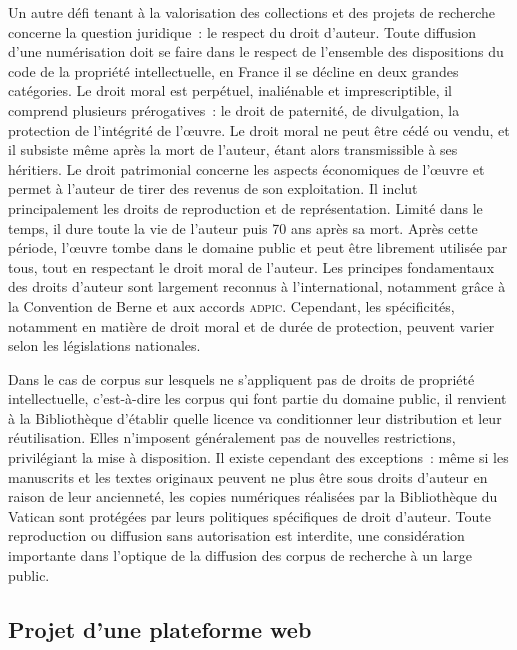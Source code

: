Un autre défi tenant à la valorisation des collections et des projets de
recherche concerne la question juridique~: le respect du droit d'auteur.
Toute diffusion d'une numérisation doit se faire dans le respect de
l'ensemble des dispositions du code de la propriété intellectuelle, en
France il se décline en deux grandes catégories. Le droit moral est
perpétuel, inaliénable et imprescriptible, il comprend plusieurs
prérogatives~: le droit de paternité, de divulgation, la protection de
l'intégrité de l'œuvre. Le droit moral ne peut être cédé ou vendu, et il
subsiste même après la mort de l'auteur, étant alors transmissible à ses
héritiers. Le droit patrimonial concerne les aspects économiques de
l'œuvre et permet à l'auteur de tirer des revenus de son exploitation.
Il inclut principalement les droits de reproduction et de
représentation. Limité dans le temps, il dure toute la vie de l'auteur
puis 70 ans après sa mort. Après cette période, l'œuvre tombe dans le
domaine public et peut être librement utilisée par tous, tout en
respectant le droit moral de l'auteur. Les principes fondamentaux des
droits d'auteur sont largement reconnus à l'international, notamment
grâce à la Convention de Berne et aux accords \textsc{adpic}. Cependant, les
spécificités, notamment en matière de droit moral et de durée de
protection, peuvent varier selon les législations nationales.

Dans le cas de corpus sur lesquels ne s'appliquent pas de droits de
propriété intellectuelle, c'est-à-dire les corpus qui font partie du
domaine public, il renvient à la Bibliothèque d'établir quelle licence
va conditionner leur distribution et leur réutilisation. Elles
n'imposent généralement pas de nouvelles restrictions, privilégiant la
mise à disposition. Il existe cependant des exceptions~: même si les
manuscrits et les textes originaux peuvent ne plus être sous droits
d'auteur en raison de leur ancienneté, les copies numériques réalisées
par la Bibliothèque du Vatican sont protégées par leurs politiques
spécifiques de droit d'auteur. Toute reproduction ou diffusion sans
autorisation est interdite, une considération importante dans l'optique de la diffusion des corpus de recherche à un large public.

\hypertarget{projet-dune-plateforme-web}{%
\subsection{Projet d'une plateforme
web}\label{projet-dune-plateforme-web}}

